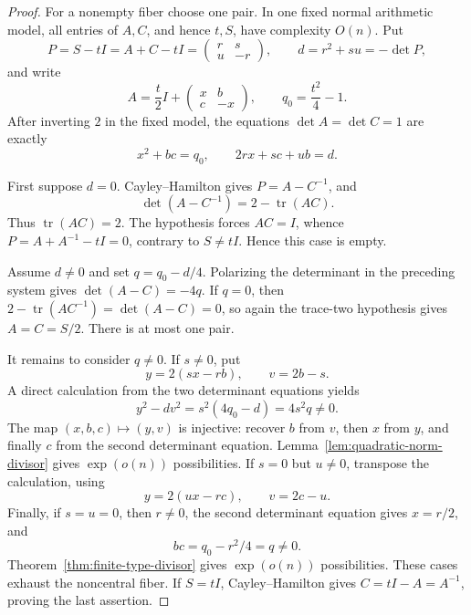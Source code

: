 \documentclass[11pt,reqno]{amsart}
\theoremstyle{definition}
\theoremstyle{remark}
\newcommand{\Tr}{\operatorname{tr}}
\begin{document}
\begin{proof}
For a nonempty fiber choose one pair.  In one fixed normal arithmetic model,
all entries of \(A,C\), and hence \(t,S\), have complexity \(O(n)\).  Put
\[
 P=S-tI=A+C-tI
  =\begin{pmatrix}r&s\\u&-r\end{pmatrix},
 \qquad d=r^2+su=-\det P,
\]
and write
\[
 A=\frac t2I+\begin{pmatrix}x&b\\c&-x\end{pmatrix},
 \qquad q_0=\frac{t^2}{4}-1.
\]
After inverting \(2\) in the fixed model, the equations
\(\det A=\det C=1\) are exactly
\[
 x^2+bc=q_0,\qquad 2rx+sc+ub=d.
\]

First suppose \(d=0\).  Cayley--Hamilton gives
\(P=A-C^{-1}\), and
\[
 \det(A-C^{-1})=2-\Tr(AC).
\]
Thus \(\Tr(AC)=2\).  The hypothesis forces \(AC=I\), whence
\(P=A+A^{-1}-tI=0\), contrary to \(S\ne tI\).  Hence this case is empty.

Assume \(d\ne0\) and set \(q=q_0-d/4\).  Polarizing the determinant in the
preceding system gives \(\det(A-C)=-4q\).  If \(q=0\), then
\(2-\Tr(AC^{-1})=\det(A-C)=0\), so again the trace-two hypothesis gives
\(A=C=S/2\).  There is at most one pair.

It remains to consider \(q\ne0\).  If \(s\ne0\), put
\[
 y=2(sx-rb),\qquad v=2b-s.
\]
A direct calculation from the two determinant equations yields
\[
 y^2-dv^2=s^2(4q_0-d)=4s^2q\ne0.
\]
The map \((x,b,c)\mapsto(y,v)\) is injective: recover \(b\) from \(v\),
then \(x\) from \(y\), and finally \(c\) from the second determinant
equation.  Lemma~\ref{lem:quadratic-norm-divisor} gives \(\exp(o(n))\)
possibilities.  If \(s=0\) but \(u\ne0\), transpose the calculation, using
\[
 y=2(ux-rc),\qquad v=2c-u.
\]
Finally, if \(s=u=0\), then \(r\ne0\), the second determinant equation gives
\(x=r/2\), and
\[
 bc=q_0-r^2/4=q\ne0.
\]
Theorem~\ref{thm:finite-type-divisor} gives \(\exp(o(n))\) possibilities.
These cases exhaust the noncentral fiber.  If \(S=tI\), Cayley--Hamilton
gives \(C=tI-A=A^{-1}\), proving the last assertion.
\end{proof}
\end{document}
